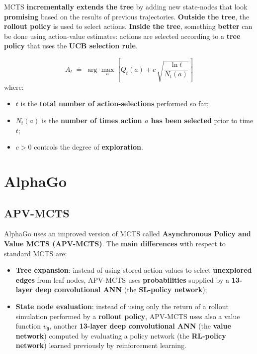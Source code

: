 \documentclass[11pt,a4paper]{article}
\theoremstyle{definition}
\theoremstyle{plain}
\theoremstyle{remark}
\begin{document}
MCTS \textbf{incrementally extends the tree} by adding new state-nodes that look \textbf{promising} based on the results of previous trajectories. \textbf{Outside the tree}, the \textbf{rollout policy} is used to select actions. \textbf{Inside the tree}, something \textbf{better} can be done using action-value estimates: actions are selected according to a \textbf{tree policy} that uses the \textbf{UCB selection rule}.

\begin{tcolorbox}[colback=blue!5!white, colframe=blue!60!black, title={UCB Tree-Policy Selection Rule}]
\[
    A_t \;\doteq\; \arg\max_a \left[ Q_t(a) + c\, \sqrt{\frac{\ln t}{N_t(a)}} \right]
\]
where:
\begin{itemize}
    \item $t$ is the \textbf{total number of action-selections} performed so far;
    \item $N_t(a)$ is the \textbf{number of times action $a$ has been selected} prior to time $t$;
    \item $c > 0$ controls the degree of \textbf{exploration}.
\end{itemize}
\end{tcolorbox}

\section{AlphaGo}

\subsection{APV-MCTS}

AlphaGo uses an improved version of MCTS called \textbf{Asynchronous Policy and Value MCTS (APV-MCTS)}. The \textbf{main differences} with respect to standard MCTS are:
\begin{itemize}
    \item \textbf{Tree expansion}: instead of using stored action values to select \textbf{unexplored edges} from leaf nodes, APV-MCTS uses \textbf{probabilities} supplied by a \textbf{13-layer deep convolutional ANN} (the \textbf{SL-policy network});
    \item \textbf{State node evaluation}: instead of using only the return of a rollout simulation performed by a \textbf{rollout policy}, APV-MCTS uses also a value function $v_{\boldsymbol{\theta}}$, another \textbf{13-layer deep convolutional ANN} (the \textbf{value network}) computed by evaluating a policy network (the \textbf{RL-policy network}) learned previously by reinforcement learning.
\end{itemize}
\end{document}
